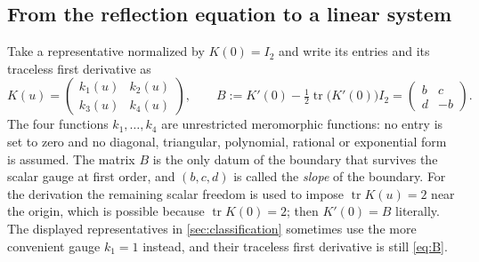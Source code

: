 \documentclass[11pt,reqno]{amsart}
\theoremstyle{plain}
\theoremstyle{definition}
\theoremstyle{remark}
\numberwithin{equation}{section}
\providecommand{\tr}{\operatorname{tr}}
\newcommand{\Id}{I_2}
\begin{document}
\subsection{From the reflection equation to a linear system}

Take a representative normalized by $K(0)=\Id$ and write its entries and its
traceless first derivative as
\begin{equation}
K(u)=\begin{pmatrix}k_1(u)&k_2(u)\\k_3(u)&k_4(u)\end{pmatrix},
\qquad
B:=K'(0)-\tfrac12\tr\bigl(K'(0)\bigr)\Id
=\begin{pmatrix}b&c\\d&-b\end{pmatrix}.       \label{eq:B}
\end{equation}
The four functions $k_1,\dots,k_4$ are unrestricted meromorphic functions: no
entry is set to zero and no diagonal, triangular, polynomial, rational or
exponential form is assumed. The matrix $B$ is the only datum of the boundary
that survives the scalar gauge at first order, and $(b,c,d)$ is called the
\emph{slope} of the boundary. For the derivation the remaining scalar freedom is
used to impose $\tr K(u)=2$ near the origin, which is possible because
$\tr K(0)=2$; then $K'(0)=B$ literally. The displayed representatives in
\cref{sec:classification} sometimes use the more convenient gauge $k_1=1$
instead, and their traceless first derivative is still \cref{eq:B}.
\end{document}
